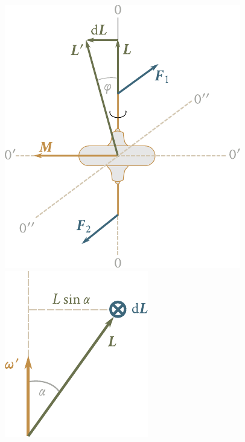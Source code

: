 \begin{figure}[t]
	\begin{minipage}[t]{0.55\linewidth}
		\begin{center}
			\includegraphics[scale=0.95]{figures/ch_05/fig_5_23.pdf}
			\caption[]{}
			\label{fig:5_23}
		\end{center}
	\end{minipage}
	\hspace{-0.05cm}
	\begin{minipage}[t]{0.45\linewidth}
		\begin{center}
			\includegraphics[scale=0.95]{figures/ch_05/fig_5_24.pdf}
			\caption[]{}
			\label{fig:5_24}
		\end{center}
	\end{minipage}
	\vspace{-0.65cm}
\end{figure}

